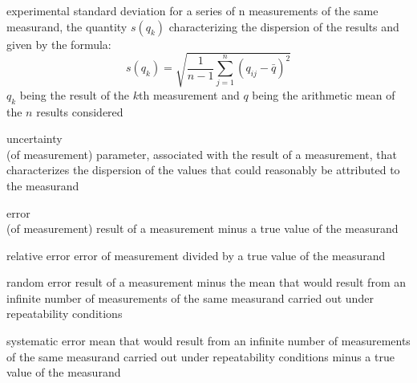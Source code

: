 \documentclass[avery5371,grid]{flashcards}
\begin{document}
\begin{flashcard}[Definition]{experimental standard deviation}
\vspace{\fill}
    for a series of n measurements of the same measurand, the quantity $s(q_k)$ characterizing the dispersion of the results and given by the formula:
    \begin{equation*}
        s(q_k) = \sqrt{ \frac{1}{n-1} \sum_{j=1}^{n} \left( q_{ij} - \bar{q} \right)^2 }
    \end{equation*}
    $q_k$ being the result of the $k$th measurement and $q$ being the arithmetic mean of the $n$ results considered
\vspace{\fill}
\end{flashcard}

\begin{flashcard}[Definition]{uncertainty \\ (of measurement)}
\vspace{\fill}
    parameter, associated with the result of a measurement, that characterizes the dispersion of the values that could reasonably be attributed to the measurand
\vspace{\fill}
\end{flashcard}

\begin{flashcard}[Definition]{error \\ (of measurement)}
\vspace{\fill}
    result of a measurement minus a true value of the measurand
\vspace{\fill}
\end{flashcard}

\begin{flashcard}[Definition]{relative error}
\vspace{\fill}
    error of measurement divided by a true value of the measurand
\vspace{\fill}
\end{flashcard}

\begin{flashcard}[Definition]{random error}
\vspace{\fill}
    result of a measurement minus the mean that would result from an infinite number of measurements of the same measurand carried out under repeatability conditions
\vspace{\fill}
\end{flashcard}

\begin{flashcard}[Definition]{systematic error}
\vspace{\fill}
    mean that would result from an infinite number of measurements of the same measurand carried out under repeatability conditions minus a true value of the measurand
\vspace{\fill}
\end{flashcard}
\end{document}
